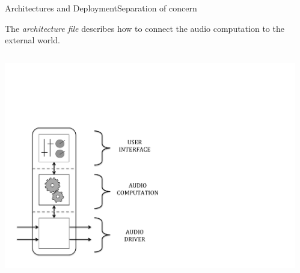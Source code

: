 
\begin{frame}{Architectures and Deployment}{Separation of concern}
	
The \emph{architecture file} describes how to connect the audio computation to the external world.

\begin{columns}[t]

\begin{column}{0.25\textwidth}
	\begin{center}
 	\includegraphics[height=0.425\textheight]{images/FL-Faust_Construction3}
 	\end{center}

\end{column}
\begin{column}{0.75\textwidth}


\end{column}
\end{columns}
\end{frame}
